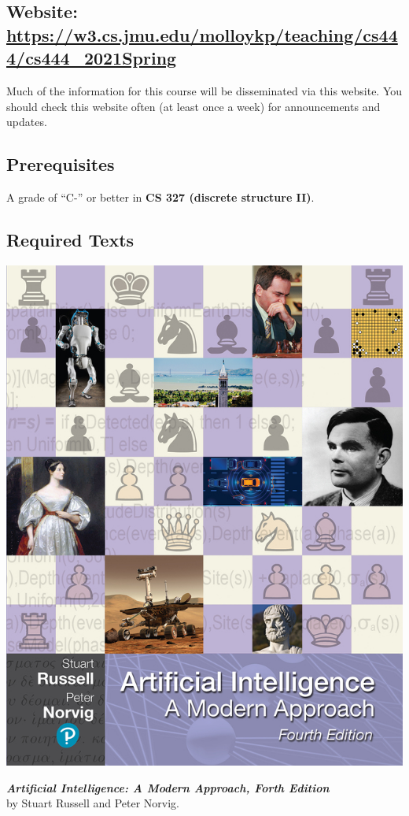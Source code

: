 \documentclass[11pt]{article}
\begin{document}
\subsection{Website: \href{https://w3.cs.jmu.edu/molloykp/teaching/cs444/cs444\_2021Spring}
                                          {https://w3.cs.jmu.edu/molloykp/teaching/cs444/cs444\_2021Spring}}
Much of the information for this course will be disseminated via this website.  You should
check this website often (at least once a week) for announcements and updates.
                           
\subsection{Prerequisites}
A grade of ``C-'' or better in {\bf CS 327 (discrete structure II)}. 




\subsection{Required Texts}
\begin{minipage}{0.3\textwidth}
\includegraphics[width=\linewidth]{RusselNorvigTextbookImage4thED.jpg}
\end{minipage}
\begin{minipage}{0.6\textwidth}
\emph{{\bf Artificial Intelligence: A Modern Approach, Forth Edition}} \\by  Stuart Russell and Peter Norvig.
\end{minipage}
\end{document}
